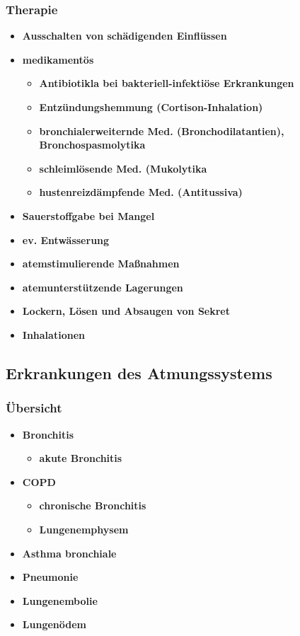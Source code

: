 	\subsubsection{Therapie}
		\begin{itemize}
			\item \textbf{Ausschalten von schädigenden Einflüssen}
			\item \textbf{medikamentös}
				\begin{itemize}
					\item \textbf{Antibiotikla bei bakteriell-infektiöse Erkrankungen}
					\item \textbf{Entzündungshemmung (Cortison-Inhalation)}
					\item \textbf{bronchialerweiternde Med. (Bronchodilatantien), Bronchospasmolytika}
					\item \textbf{schleimlösende Med. (Mukolytika}
					\item \textbf{hustenreizdämpfende Med. (Antitussiva)}
				\end{itemize}
			\item \textbf{Sauerstoffgabe bei Mangel}
			\item \textbf{ev. Entwässerung}
			\item \textbf{atemstimulierende Maßnahmen}
			\item \textbf{atemunterstützende Lagerungen}
			\item \textbf{Lockern, Lösen und Absaugen von Sekret}
			\item \textbf{Inhalationen}
		\end{itemize}
		
\subsection{Erkrankungen des Atmungssystems}
	\subsubsection{Übersicht}
		\begin{itemize}
			\item \textbf{Bronchitis}
				\begin{itemize}
					\item \textbf{akute Bronchitis}
				\end{itemize}
			\item \textbf{COPD}
				\begin{itemize}
					\item \textbf{chronische Bronchitis}
					\item \textbf{Lungenemphysem}
				\end{itemize}
			\item \textbf{Asthma bronchiale}
			\item \textbf{Pneumonie}
			\item \textbf{Lungenembolie}
			\item \textbf{Lungenödem}
		\end{itemize}
